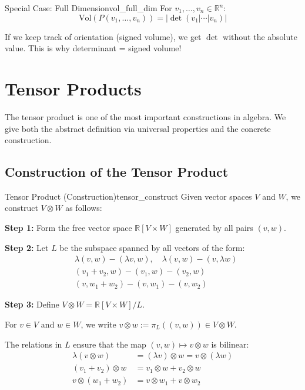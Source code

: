 \documentclass[11pt, letterpaper, openany]{book}
\begin{document}
\begin{cor}{Special Case: Full Dimension}{vol_full_dim}
For $v_1, \ldots, v_n \in \mathbb{R}^n$:
\[\text{Vol}(P(v_1, \ldots, v_n)) = |\det(v_1 | \cdots | v_n)|\]
\end{cor}

\begin{remark}
If we keep track of orientation (signed volume), we get $\det$ without the absolute value. This is why determinant = signed volume!
\end{remark}

\section{Tensor Products}

The tensor product is one of the most important constructions in algebra. We give both the abstract definition via universal properties and the concrete construction.

\subsection{Construction of the Tensor Product}

\begin{defn}{Tensor Product (Construction)}{tensor_construct}
Given vector spaces $V$ and $W$, we construct $V \otimes W$ as follows:

\textbf{Step 1:} Form the free vector space $\mathbb{R}[V \times W]$ generated by all pairs $(v, w)$.

\textbf{Step 2:} Let $L$ be the subspace spanned by all vectors of the form:
\begin{align*}
&\lambda(v, w) - (\lambda v, w), \quad \lambda(v, w) - (v, \lambda w) \\
&(v_1 + v_2, w) - (v_1, w) - (v_2, w) \\
&(v, w_1 + w_2) - (v, w_1) - (v, w_2)
\end{align*}

\textbf{Step 3:} Define $V \otimes W = \mathbb{R}[V \times W] / L$.

For $v \in V$ and $w \in W$, we write $v \otimes w := \pi_L((v, w)) \in V \otimes W$.
\end{defn}

The relations in $L$ ensure that the map $(v, w) \mapsto v \otimes w$ is bilinear:
\begin{align*}
\lambda(v \otimes w) &= (\lambda v) \otimes w = v \otimes (\lambda w) \\
(v_1 + v_2) \otimes w &= v_1 \otimes w + v_2 \otimes w \\
v \otimes (w_1 + w_2) &= v \otimes w_1 + v \otimes w_2
\end{align*}
\end{document}
